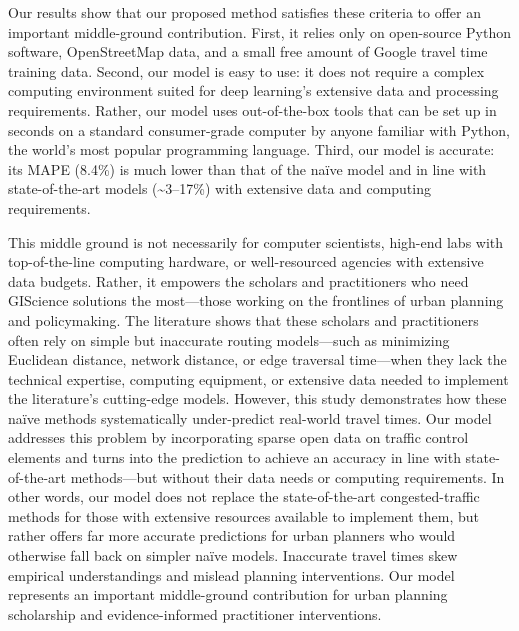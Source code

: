 \documentclass[12pt,letterpaper]{article} %
\begin{document}
Our results show that our proposed method satisfies these criteria to offer an important middle-ground contribution. First, it relies only on open-source Python software, OpenStreetMap data, and a small free amount of Google travel time training data. Second, our model is easy to use: it does not require a complex computing environment suited for deep learning's extensive data and processing requirements. Rather, our model uses out-of-the-box tools that can be set up in seconds on a standard consumer-grade computer by anyone familiar with Python, the world's most popular programming language. Third, our model is accurate: its MAPE (8.4\%) is much lower than that of the naïve model and in line with state-of-the-art models (\textasciitilde3--17\%) with extensive data and computing requirements.

This middle ground is not necessarily for computer scientists, high-end labs with top-of-the-line computing hardware, or well-resourced agencies with extensive data budgets. Rather, it empowers the scholars and practitioners who need GIScience solutions the most---those working on the frontlines of urban planning and policymaking. The literature shows that these scholars and practitioners often rely on simple but inaccurate routing models---such as minimizing Euclidean distance, network distance, or edge traversal time---when they lack the technical expertise, computing equipment, or extensive data needed to implement the literature's cutting-edge models. However, this study demonstrates how these naïve methods systematically under-predict real-world travel times. Our model addresses this problem by incorporating sparse open data on traffic control elements and turns into the prediction to achieve an accuracy in line with state-of-the-art methods---but without their data needs or computing requirements. In other words, our model does not replace the state-of-the-art congested-traffic methods for those with extensive resources available to implement them, but rather offers far more accurate predictions for urban planners who would otherwise fall back on simpler naïve models. Inaccurate travel times skew empirical understandings and mislead planning interventions. Our model represents an important middle-ground contribution for urban planning scholarship and evidence-informed practitioner interventions.
\end{document}
